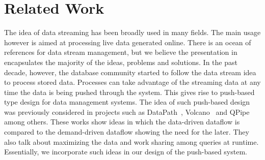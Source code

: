 \documentclass[10pt,journal,final,letterpaper,twocolumn]{IEEEtran}
\begin{document}


\section{Related Work}\label{sc:relatedwork}
The idea of data streaming has been broadly used in many fields. The
main usage however is aimed at processing live data generated
online. There is an ocean of references for data stream management,
but we believe the presentation in~\cite{DataStreamManagement}
encapsulates the majority of the ideas, problems and solutions. In
the past decade, however, the database community started to follow
the data stream idea to process stored data. Processes can take
advantage of the streaming data at any time the data is being pushed
through the system. This gives rise to push-based type design for
data management systems. The idea of such push-based design was
previously considered in projects such as DataPath~\cite{DataPath},
Volcano~\cite{Volcano} and QPipe~\cite{Qpipe} among others. These
works show ideas in which the data-driven dataflow is compared to
the demand-driven dataflow showing the need for the later. They also
talk about maximizing the data and work sharing among queries at
runtime. Essentially, we incorporate such ideas in our design of the
push-based system.
\end{document}
